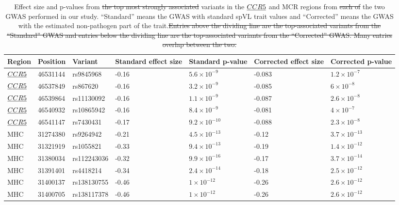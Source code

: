 \documentclass[12pt]{article} %
\providecommand{\DIFadd}[1]{{\protect\color{blue}\uwave{#1}}} %
\providecommand{\DIFdel}[1]{{\protect\color{red}\sout{#1}}}                      %
\providecommand{\DIFaddend}{} %
\providecommand{\DIFaddFL}[1]{\DIFadd{#1}} %
\providecommand{\DIFdelFL}[1]{\DIFdel{#1}} %
\providecommand{\DIFaddbeginFL}{} %
\providecommand{\DIFaddendFL}{} %
\providecommand{\DIFdelbeginFL}{} %
\providecommand{\DIFdelendFL}{} %
\newcommand{\DIFscaledelfig}{0.5}
\newlength{\DIFdelgraphicswidth} %
\newlength{\DIFdelgraphicsheight} %
\newcommand{\DIFaddincludegraphics}[2][]{{\color{blue}\fbox{\DIFOincludegraphics[#1]{#2}}}} %
\newcommand{\DIFdelincludegraphics}[2][]{%
\sbox{\DIFdelgraphicsbox}{\DIFOincludegraphics[#1]{#2}}%
\settoboxwidth{\DIFdelgraphicswidth}{\DIFdelgraphicsbox} %
\settoboxtotalheight{\DIFdelgraphicsheight}{\DIFdelgraphicsbox} %
\scalebox{\DIFscaledelfig}{%
\parbox[b]{\DIFdelgraphicswidth}{\usebox{\DIFdelgraphicsbox}\\[-\baselineskip] \rule{\DIFdelgraphicswidth}{0em}}\llap{\resizebox{\DIFdelgraphicswidth}{\DIFdelgraphicsheight}{%
\setlength{\unitlength}{\DIFdelgraphicswidth}%
\begin{picture}(1,1)%
\thicklines\linethickness{2pt} %
{\color[rgb]{1,0,0}\put(0,0){\framebox(1,1){}}}%
{\color[rgb]{1,0,0}\put(0,0){\line( 1,1){1}}}%
{\color[rgb]{1,0,0}\put(0,1){\line(1,-1){1}}}%
\end{picture}%
}\hspace*{3pt}}} %
} %
\DeclareRobustCommand{\DIFaddend}{\DIFOaddend \let\includegraphics\DIFOincludegraphics} %
\DeclareRobustCommand{\DIFaddbeginFL}{\DIFOaddbeginFL \let\includegraphics\DIFaddincludegraphics} %
\DeclareRobustCommand{\DIFaddendFL}{\DIFOaddendFL \let\includegraphics\DIFOincludegraphics} %
\DeclareRobustCommand{\DIFdelbeginFL}{\DIFOdelbeginFL \let\includegraphics\DIFdelincludegraphics} %
\DeclareRobustCommand{\DIFdelendFL}{\DIFOaddendFL \let\includegraphics\DIFOincludegraphics} %
\begin{document}
\DIFaddend %
\begin{table}[ht]
\caption{Effect size and p-values from \DIFdelbeginFL \DIFdelFL{the top most strongly associated }\DIFdelendFL \DIFaddbeginFL \DIFaddFL{top-associated }\DIFaddendFL variants in the $\emph{CCR5}$ and MCR regions from \DIFdelbeginFL \DIFdelFL{each of }\DIFdelendFL the two GWAS performed in our study. ``Standard'' means the GWAS with standard spVL trait values and ``Corrected'' means the GWAS with the estimated non-pathogen part of the trait.\DIFdelbeginFL \DIFdelFL{Entries above the dividing line are the top-associated variants from the ``Standard'' GWAS and entries below the dividing line are the top-associated variants from the ``Corrected'' GWAS. Many entries overlap between the two.}\DIFdelendFL }
\begin{tabularx}{\linewidth}{XXXXXXX}
  \hline
    Region & Position & Variant & Standard effect size & Standard p-value & Corrected effect size & Corrected p-value \\ 
  \hline
    $\emph{CCR5}$ & 46531144 & rs9845968 & -0.16 & $5.6 \times 10^{-9}$ & -0.083 & $1.2 \times 10^{-7}$ \\ 
    $\emph{CCR5}$ & 46537849 & rs867620 & -0.16 & $3.2 \times 10^{-9}$ & -0.085 & $6 \times 10^{-8}$ \\ 
    $\emph{CCR5}$ & 46539864 & rs11130092 & -0.16 & $1.1 \times 10^{-9}$ & -0.087 & $2.6 \times 10^{-8}$ \\ 
    $\emph{CCR5}$ & 46540932 & rs10865942 & -0.16 & $8.4 \times 10^{-9}$ & -0.081 & $4 \times 10^{-7}$ \\ 
    $\emph{CCR5}$ & 46541147 & rs7430431 & -0.17 & $9.2 \times 10^{-10}$ & -0.088 & $2.3 \times 10^{-8}$ \\ 
    MHC & 31274380 & rs9264942 & -0.21 & $4.5 \times 10^{-13}$ & -0.12 & $3.7 \times 10^{-13}$ \\ 
    MHC & 31321919 & rs1055821 & -0.33 & $9.4 \times 10^{-13}$ & -0.19 & $1.4 \times 10^{-12}$ \\ 
    MHC & 31380034 & rs112243036 & -0.32 & $9.9 \times 10^{-16}$ & -0.17 & $3.7 \times 10^{-14}$ \\ 
    MHC & 31391401 & rs4418214 & -0.34 & $2.4 \times 10^{-14}$ & -0.18 & $2.5 \times 10^{-12}$ \\ 
    MHC & 31400137 & rs138130755 & -0.46 & $1 \times 10^{-12}$ & -0.26 & $2.6 \times 10^{-12}$ \\ 
    MHC & 31400705 & rs138117378 & -0.46 & $1 \times 10^{-12}$ & -0.26 & $2.6 \times 10^{-12}$ \\ 

\end{tabularx}
\end{table}
\end{document}
